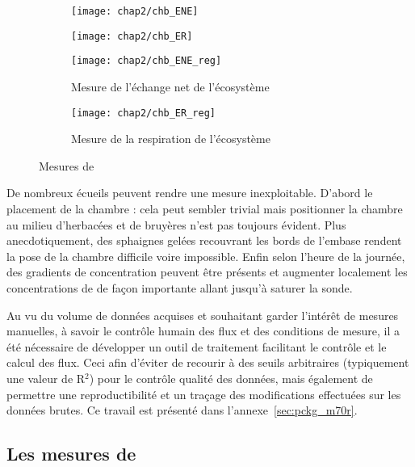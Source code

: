 \begin{figure}
	\centering
	\begin{subfigure}[t]{0.5\textwidth}
		\centering
		\texttt{[image: chap2/chb\_ENE]}
	\end{subfigure}%
	\begin{subfigure}[t]{0.5\textwidth}
		\centering
		\texttt{[image: chap2/chb\_ER]}
	\end{subfigure}%

	\begin{subfigure}[t]{0.5\textwidth}
		\texttt{[image: chap2/chb\_ENE\_reg]}
		\caption{Mesure de l'échange net de l'écosystème}
	\end{subfigure}%
	\begin{subfigure}[t]{0.5\textwidth}
		\texttt{[image: chap2/chb\_ER\_reg]}
		\caption{Mesure de la respiration de l'écosystème}
	\end{subfigure}
\caption{Mesures de \coo}
\label{fig:chb}
\end{figure}


De nombreux écueils peuvent rendre une mesure inexploitable. D'abord le placement de la chambre : cela peut sembler trivial mais positionner la chambre au milieu d'herbacées et de bruyères n'est pas toujours évident. 
Plus anecdotiquement, des sphaignes gelées recouvrant les bords de l'embase rendent la pose de la chambre difficile voire impossible. 
Enfin selon l'heure de la journée, des gradients de concentration peuvent être présents et augmenter localement les concentrations de \coo de façon importante allant jusqu'à saturer la sonde.

Au vu du volume de données acquises et souhaitant garder l'intérêt de mesures manuelles, à savoir le contrôle humain des flux et des conditions de mesure, il a été nécessaire de développer un outil de traitement facilitant le contrôle et le calcul des flux.
Ceci afin d'éviter de recourir à des seuils arbitraires (typiquement une valeur de R$^{2}$) pour le contrôle qualité des données, mais également de permettre une reproductibilité et un traçage des modifications effectuées sur les données brutes.
Ce travail est présenté dans l'annexe~\ref{sec:pckg_m70r}.

\subsection{Les mesures de \texorpdfstring{\chh}{CH4}}

